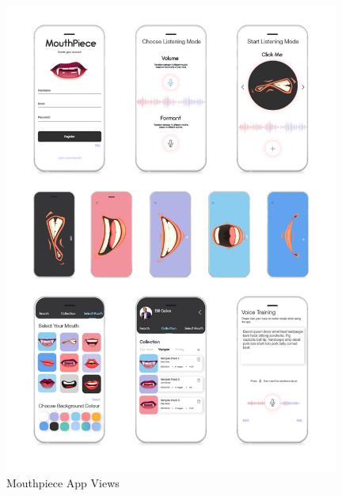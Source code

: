 \documentclass{article}
\begin{document}
\begin{figure}[h!]
    \centering
    \includegraphics[width=11cm]{views.jpg}
    \caption{Mouthpiece App Views}
\end{figure}
\end{document}
